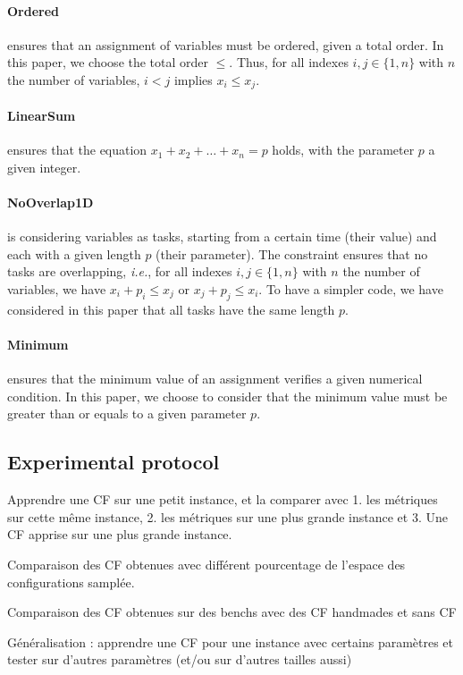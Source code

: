 \documentclass{article}
\newcommand{\ie}{\textit{i.e.}}
\begin{document}
\paragraph{Ordered} ensures  that an  assignment of variables  must be
ordered, given a total order. In this paper, we choose the total order
$\leq$. Thus, for all indexes $i,j \in \{1,n\}$ with $n$ the number of
variables, $i < j$ implies $x_i \leq x_j$.
\paragraph{LinearSum}       ensures       that      the       equation
$x_1 + x_2 +  \ldots + x_n = p$ holds, with the  parameter $p$ a given
integer.
\paragraph{NoOverlap1D}  is considering  variables as  tasks, starting
from a  certain time (their  value) and each  with a given  length $p$
(their  parameter).    The  constraint  ensures  that   no  tasks  are
overlapping,  \ie, for  all indexes  $i,j  \in \{1,n\}$  with $n$  the
number   of   variables,  we   have   $x_i   +   p_i  \leq   x_j$   or
$x_j + p_j \leq  x_i$.  To have a simpler code,  we have considered in
this paper that all tasks have the same length $p$.
\paragraph{Minimum} ensures  that the  minimum value of  an assignment
verifies  a given  numerical condition.  In this  paper, we  choose to
consider that  the minimum value must  be greater than or  equals to a
given parameter $p$.

\subsection{Experimental protocol}



Apprendre une  CF sur une petit  instance, et la comparer  avec 1. les
métriques  sur cette  même instance,  2.  les métriques  sur une  plus
grande instance et 3. Une CF apprise sur une plus grande instance.

Comparaison des CF obtenues avec différent pourcentage de l'espace des
configurations samplée.

Comparaison des  CF obtenues sur des  benchs avec des CF  handmades et
sans CF

Généralisation  : apprendre  une CF  pour une  instance avec  certains
paramètres  et  tester sur  d'autres  paramètres  (et/ou sur  d'autres
tailles aussi)
\end{document}
